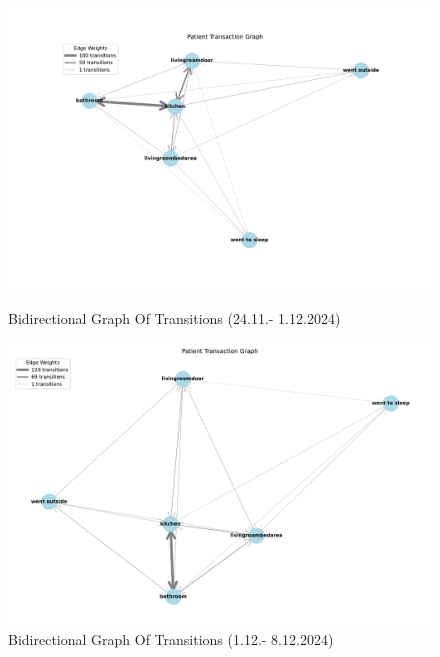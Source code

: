 \documentclass[A4,10pt]{article}
\begin{document}
\begin{figure}[H]
	\centering
	\begin{minipage}{0.45\textwidth}
		\centering
		\includegraphics[width=\textwidth]{biderictional_model1.pdf}
		\caption{Bidirectional Graph Of Transitions (24.11.- 1.12.2024)}
		\label{fig:model1}
	\end{minipage}\hspace{0.04\textwidth}
	\begin{minipage}{0.45\textwidth}
		\centering
		\includegraphics[width=\textwidth]{biderictional_model2.pdf}
		\caption{Bidirectional Graph Of Transitions (1.12.- 8.12.2024)}
		\label{fig:model2}
	\end{minipage}
\end{figure}
\end{document}
